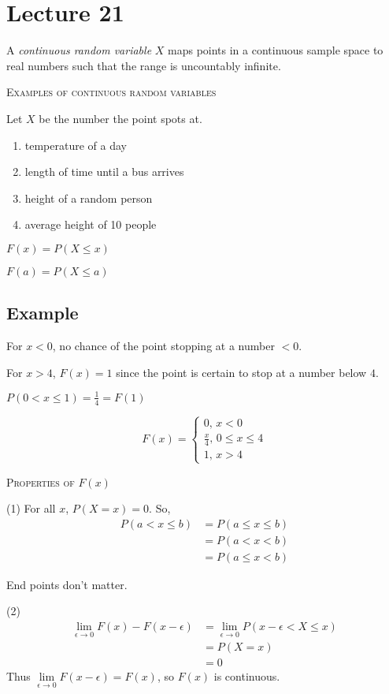 \section{Lecture 21}
A \emph{continuous random variable} $ X $ maps points in a continuous
sample space to real numbers such that the range is uncountably infinite.

\textsc{Examples of continuous random variables}

Let $ X $ be the number the point spots at.
\begin{enumerate}[(1)]
    \item temperature of a day
    \item length of time until a bus arrives
    \item height of a random person
    \item average height of 10 people
\end{enumerate}

$F(x)=P(X\le x)$

$F(a)=P(X\le a) $

\subsection{Example}
For $ x<0 $, no chance of the point stopping at a number $ <0 $.

For $ x>4 $, $ F(x)=1 $ since the point is certain to stop at a number
below $ 4 $.

$ P(0<x\le 1)=\frac{1}{4}=F(1) $

\[ F(x)=\begin{cases}
    0,\, x<0\\
    \frac{x}{4},\,0\le x\le 4 \\
    1,\,x>4
\end{cases} \]

\textsc{Properties of $ F(x) $}

(1) For all $ x $, $ P(X=x)=0 $. So,
\begin{align*}
    P(a<x\le b)&=P(a\le x\le b)\\
    &=P(a<x<b)\\
    &=P(a\le x<b)
\end{align*}
\begin{remark}
    End points don't matter.
\end{remark}

(2) \begin{align*}
    \lim\limits_{{\epsilon} \to {0}} F(x)-F(x-\epsilon)&=
    \lim\limits_{{\epsilon} \to {0}} P(x-\epsilon<X\le x)\\
    &=P(X=x)\\
    &=0
\end{align*}
Thus $ \lim\limits_{{\epsilon} \to {0}} F(x-\epsilon)=F(x) $, so
$ F(x) $ is continuous.

